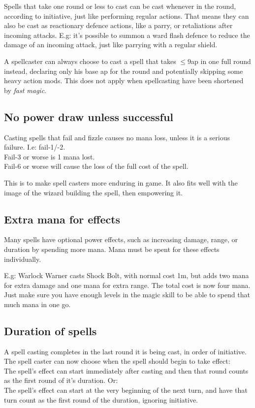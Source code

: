 Spells that take one round or less to cast can be cast whenever in the round, according to initiative, just like performing regular actions. That means they can also be cast as reactionary defence actions, like a parry, or retaliations after incoming attacks.
E.g: it's possible to summon a ward flash defence to reduce the damage of an incoming attack, just like parrying with a regular shield.

A spellcaster can always choose to cast a spell that takes $\le$9ap in one full round instead, declaring only his base ap for the round and potentially skipping some heavy action mods. This does not apply when spellcasting have been shortened by \emph{fast magic}.


\subsection*{No power draw unless successful}
Casting spells that fail and fizzle causes no mana loss, unless it is a serious failure. I.e: fail-1/-2. \\
Fail-3 or worse is 1 mana lost. \\
Fail-6 or worse will cause the loss of the full cost of the spell.

This is to make spell casters more enduring in game. It also fits well with the image of the wizard building the spell, then empowering it.


\subsection*{Extra mana for effects}
Many spells have optional power effects, such as increasing damage, range, or duration by spending more mana. Mana must be spent for these effects individually.

E.g: Warlock Warner casts Shock Bolt, with normal cost 1m, but adds two mana for extra damage and one mana for extra range. The total cost is now four mana.
Just make sure you have enough levels in the magic skill to be able to spend that much mana in one go.


\subsection*{Duration of spells}
A spell casting completes in the last round it is being cast, in order of initiative. The spell caster can now choose when the spell should begin to take effect: \\
The spell's effect can start immediately after casting and then that round counts as the first round of it's duration. Or: \\
The spell's effect can start at the very beginning of the next turn, and have that turn count as the first round of the duration, ignoring initiative.

